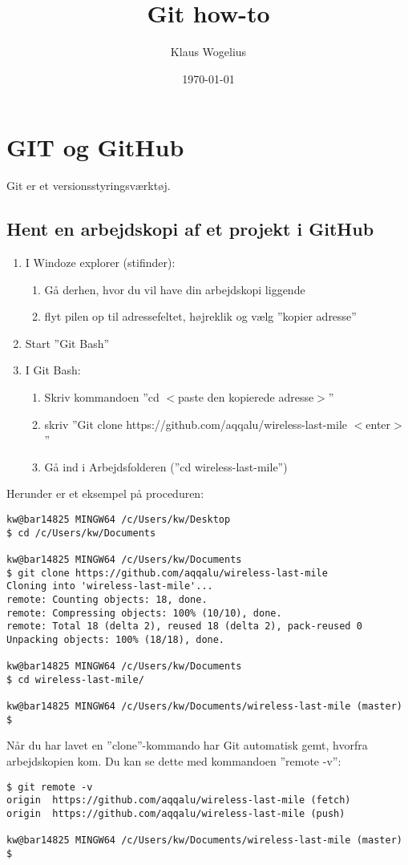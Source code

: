 \documentclass[11pt,a4paper,twoside]{report}
\title{Git how-to}
\author{Klaus Wogelius}
\date{\today}
\begin{document}
\maketitle
\tableofcontents

\chapter{GIT og GitHub}
Git er et versionsstyringsværktøj.

\section{Hent en arbejdskopi af et projekt i GitHub} \label{clone}

\begin{enumerate}

 \item I Windoze explorer (stifinder):
 \begin{enumerate}
  \item Gå derhen, hvor du vil have din arbejdskopi liggende
  \item flyt pilen op til adressefeltet, højreklik og vælg ''kopier adresse''
 \end{enumerate}
 \item Start ''Git Bash''
 \item I Git Bash:
 \begin{enumerate}
  \item Skriv kommandoen ''cd $<$paste den kopierede adresse$>$''
  \item skriv ''Git clone https://github.com/aqqalu/wireless-last-mile $<$enter$>$''
  \item Gå ind i Arbejdsfolderen (''cd wireless-last-mile'')
 \end{enumerate}
\end{enumerate}
Herunder er et eksempel på proceduren:
\begin{verbatim}
kw@bar14825 MINGW64 /c/Users/kw/Desktop
$ cd /c/Users/kw/Documents

kw@bar14825 MINGW64 /c/Users/kw/Documents
$ git clone https://github.com/aqqalu/wireless-last-mile
Cloning into 'wireless-last-mile'...
remote: Counting objects: 18, done.
remote: Compressing objects: 100% (10/10), done.
remote: Total 18 (delta 2), reused 18 (delta 2), pack-reused 0
Unpacking objects: 100% (18/18), done.

kw@bar14825 MINGW64 /c/Users/kw/Documents
$ cd wireless-last-mile/

kw@bar14825 MINGW64 /c/Users/kw/Documents/wireless-last-mile (master)
$
\end{verbatim}
\par
Når  du har lavet en ''clone''-kommando har Git automatisk gemt, hvorfra arbejdskopien kom. Du kan se dette med kommandoen ''remote -v'':
\begin{verbatim}
$ git remote -v
origin  https://github.com/aqqalu/wireless-last-mile (fetch)
origin  https://github.com/aqqalu/wireless-last-mile (push)

kw@bar14825 MINGW64 /c/Users/kw/Documents/wireless-last-mile (master)
$ 
\end{verbatim}
\end{document}
